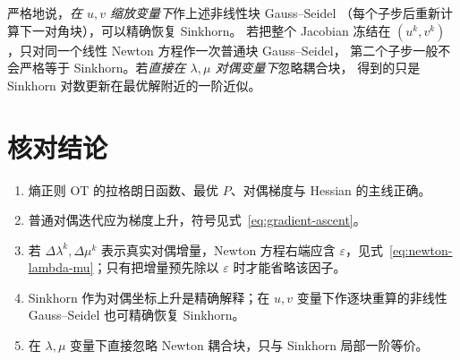 \documentclass[11pt,a4paper]{ctexart}
\begin{document}
\begin{checknote}
严格地说，\emph{在 $u,v$ 缩放变量下}作上述非线性块 Gauss--Seidel
（每个子步后重新计算下一对角块），可以精确恢复 Sinkhorn。
若把整个 Jacobian 冻结在 $(u^k,v^k)$，只对同一个线性 Newton 方程作一次普通块 Gauss--Seidel，
第二个子步一般不会严格等于 Sinkhorn。若\emph{直接在 $\lambda,\mu$ 对偶变量下}忽略耦合块，
得到的只是 Sinkhorn 对数更新在最优解附近的一阶近似。
\end{checknote}

\section*{核对结论}

\begin{enumerate}[leftmargin=2em,itemsep=0.45em]
  \item 熵正则 OT 的拉格朗日函数、最优 $P$、对偶梯度与 Hessian 的主线正确。
  \item 普通对偶迭代应为梯度上升，符号见式~\eqref{eq:gradient-ascent}。
  \item 若 $\Delta\lambda^k,\Delta\mu^k$ 表示真实对偶增量，Newton 方程右端应含 $\varepsilon$，见式~\eqref{eq:newton-lambda-mu}；只有把增量预先除以 $\varepsilon$ 时才能省略该因子。
  \item Sinkhorn 作为对偶坐标上升是精确解释；在 $u,v$ 变量下作逐块重算的非线性 Gauss--Seidel 也可精确恢复 Sinkhorn。
  \item 在 $\lambda,\mu$ 变量下直接忽略 Newton 耦合块，只与 Sinkhorn 局部一阶等价。
\end{enumerate}
\end{document}
